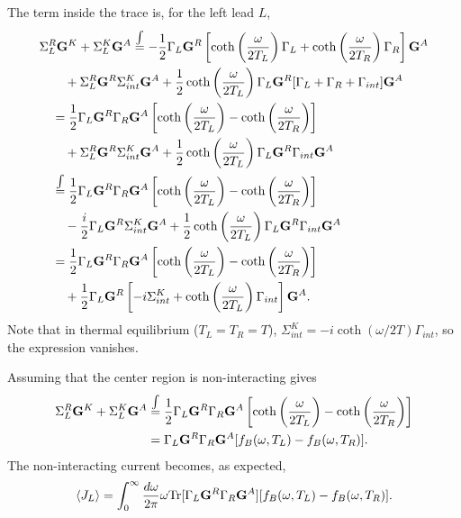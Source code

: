 The term inside the trace is, for the left lead $L$, 
\begin{alignat}{2}
  &\Sigma_L^R \mathbf{G}^K + \Sigma_{L}^K \mathbf{G}^A \hspace{-0mm}\stackrel{\int} {=} - \frac{1}{2} \Gamma_L \mathbf{G}^R \left[\coth\left(\frac{\omega}{2T_L}\right)\Gamma_L+\coth\left(\frac{\omega}{2T_R}\right)\Gamma_R \right]\mathbf{G}^A  \notag \\
  &\qquad + \Sigma_L^R\mathbf{G}^R \Sigma_{int}^K\mathbf{G}^A  + \frac{1}{2} \coth\left(\frac{\omega}{2T_L}\right)  \Gamma_L \mathbf{G}^R [\Gamma_L+\Gamma_R+\Gamma_{int}] \mathbf{G}^A \\
  &\quad = \frac{1}{2} \Gamma_L \mathbf{G}^R \Gamma_R \mathbf{G}^A \left[\coth\left(\frac{\omega}{2T_L}\right)-\coth\left(\frac{\omega}{2T_R}\right) \right] \notag \\
  &\qquad + \Sigma_L^R\mathbf{G}^R \Sigma_{int}^K\mathbf{G}^A + \frac{1}{2} \coth\left(\frac{\omega}{2T_L}\right) \Gamma_L \mathbf{G}^R\Gamma_{int}\mathbf{G}^A \\
  &\quad \stackrel{\int} {=} \frac{1}{2} \Gamma_L \mathbf{G}^R \Gamma_R \mathbf{G}^A \left[\coth\left(\frac{\omega}{2T_L}\right)-\coth\left(\frac{\omega}{2T_R}\right) \right] \notag \\
  &\qquad - \frac{i}{2} \Gamma_L\mathbf{G}^R \Sigma_{int}^K\mathbf{G}^A + \frac{1}{2} \coth\left(\frac{\omega}{2T_L}\right) \Gamma_L \mathbf{G}^R\Gamma_{int}\mathbf{G}^A \\
  &\quad = \frac{1}{2} \Gamma_L \mathbf{G}^R \Gamma_R \mathbf{G}^A \left[\coth\left(\frac{\omega}{2T_L}\right)-\coth\left(\frac{\omega}{2T_R}\right) \right] \notag \\
  &\qquad + \frac{1}{2} \Gamma_L\mathbf{G}^R \left[ -i \Sigma^K_{int}+\coth\left(\frac{\omega}{2T_L}\right)\Gamma_{int} \right] \mathbf{G}^A .
\end{alignat}
Note that in thermal equilibrium ($T_L=T_R=T$), $\Sigma_{int}^K=-i\coth(\omega/2T)\Gamma_{int}$, so the expression vanishes.

Assuming that the center region is non-interacting gives
\begin{alignat}{2}
  \Sigma_L^R \mathbf{G}^K + \Sigma_{L}^K \mathbf{G}^A &\hspace{-0mm}\stackrel{\int} {=} \frac{1}{2} \Gamma_L \mathbf{G}^R \Gamma_R \mathbf{G}^A \left[\coth\left(\frac{\omega}{2T_L}\right)-\coth\left(\frac{\omega}{2T_R}\right) \right] \\
  & = \Gamma_L \mathbf{G}^R \Gamma_R \mathbf{G}^A [f_B(\omega,T_L)-f_B(\omega,T_R)].
\end{alignat}
The non-interacting current becomes, as expected,
\begin{equation}
 \langle J_L \rangle = \int_0^{\infty} \frac{d\omega}{2\pi} \omega \textrm{Tr}[\Gamma_L \mathbf{G}^R \Gamma_R \mathbf{G}^A] [f_B(\omega,T_L)-f_B(\omega,T_R)].
\end{equation}

